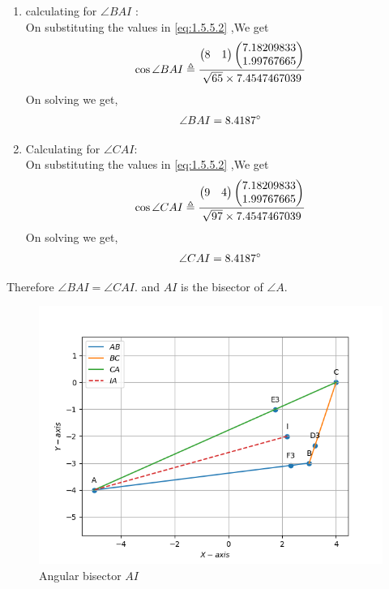 \documentclass[10pt]{book}
\begin{document}
\begin{enumerate}[label=\thesection.\arabic*.,ref=\thesection.\theenumi]
\begin{enumerate}
    \item calculating for $\angle BAI$ : \\
    On substituting the values in  \eqref{eq:1.5.5.2} ,We get 
    \begin{align}
        \cos{\angle BAI} \triangleq \frac{\begin{pmatrix} 8 & 1\end{pmatrix}\begin{pmatrix}7.18209833 \\ 1.99767665\end{pmatrix}}{ 
        \sqrt{65}\times 7.4547467039} \\
    \end{align}
    On solving we get,
    \begin{align}
        \angle BAI = 8.4187\degree
    \end{align}
       \item Calculating for $\angle CAI$: \\
    On substituting the values in  \eqref{eq:1.5.5.2} ,We get 
    \begin{align}
        \cos{\angle CAI} \triangleq \frac{\begin{pmatrix} 9 & 4\end{pmatrix}\begin{pmatrix}7.18209833 \\ 1.99767665\end{pmatrix}}{ \sqrt{97}\times 7.4547467039 } \\
    \end{align}
    On solving we get,
    \begin{align}
        \angle CAI = 8.4187\degree
    \end{align}
\end{enumerate}
Therefore $\angle BAI = \angle CAI.$ and $AI$ is the bisector of $\angle A$. 
\begin{figure}[H]
    \centering
    \includegraphics{figs/AI_bisector.png}
    \caption{Angular bisector  $AI$}
    \label{fig:Ang_bisect4}
\end{figure}



\end{enumerate}
\end{document}
